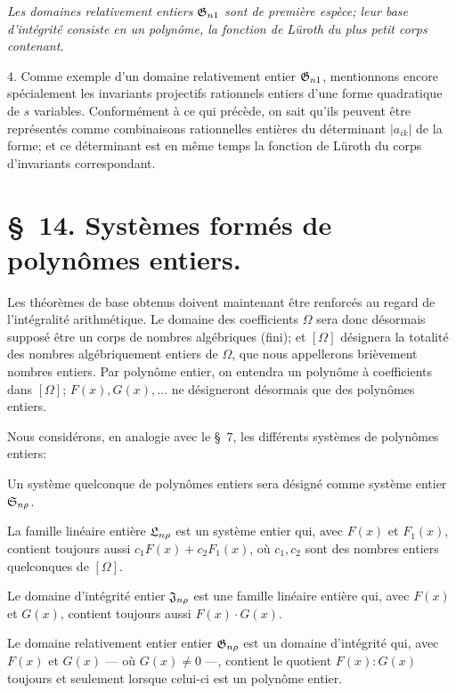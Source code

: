\emph{Les domaines relativement entiers $\mathfrak{G}_{n1}$ sont de première espèce; leur base d'intégrité consiste en un polynôme, la fonction de Lüroth du plus petit corps contenant.}

4. Comme exemple d'un domaine relativement entier $\mathfrak{G}_{n1}$, mentionnons encore spécialement les invariants projectifs rationnels entiers d'une forme quadratique de $s$ variables. Conformément à ce qui précède, on sait qu'ils peuvent être représentés comme combinaisons rationnelles entières du déterminant $|a_{ik}|$ de la forme; et ce déterminant est en même temps la fonction de Lüroth du corps d'invariants correspondant.

\section*{\S\ 14. Systèmes formés de polynômes entiers.}

Les théorèmes de base obtenus doivent maintenant être renforcés au regard de l'intégralité arithmétique. Le domaine des coefficients $\Omega$ sera donc désormais supposé être un corps de nombres algébriques (fini); et $[\Omega]$ désignera la totalité des nombres algébriquement entiers de $\Omega$, que nous appellerons brièvement nombres entiers. Par polynôme entier, on entendra un polynôme à coefficients dans $[\Omega]$; $F(x),G(x),\ldots$ ne désigneront désormais que des polynômes entiers.

Nous considérons, en analogie avec le \S\ 7, les différents systèmes de polynômes entiers:

Un système quelconque de polynômes entiers sera désigné comme système entier $\mathfrak{S}_{n\rho}$.

La famille linéaire entière $\mathfrak{L}_{n\rho}$ est un système entier qui, avec $F(x)$ et $F_1(x)$, contient toujours aussi $c_1F(x)+c_2F_1(x)$, où $c_1,c_2$ sont des nombres entiers quelconques de $[\Omega]$.

Le domaine d’intégrité entier $\mathfrak{J}_{n\rho}$ est une famille linéaire entière qui, avec $F(x)$ et $G(x)$, contient toujours aussi $F(x)\cdot G(x)$.

Le domaine relativement entier entier $\mathfrak{G}_{n\rho}$ est un domaine d’intégrité qui, avec $F(x)$ et $G(x)$ --- où $G(x)\ne0$ ---, contient le quotient $F(x):G(x)$ toujours et seulement lorsque celui-ci est un polynôme entier.


